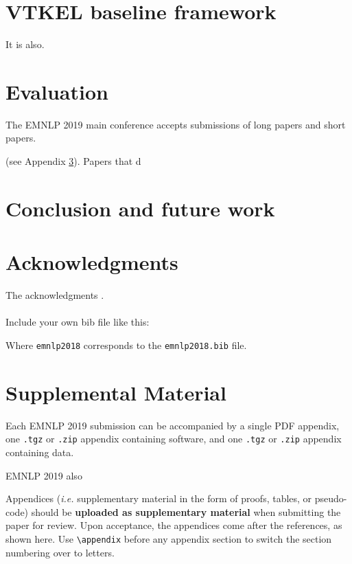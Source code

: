 \documentclass[11pt,a4paper]{article}
\newcommand\confname{EMNLP 2019}
\begin{document}

\section{VTKEL baseline framework}

It is also.

\section{Evaluation}
\label{sec:length}

The \confname{} main conference accepts submissions of long papers and
short papers.

 (see Appendix
\ref{sec:supplemental}). Papers that d


\section*{Conclusion and future work}

\section*{Acknowledgments}

The acknowledgments . \\

 \\

Include your own bib file like this:
{\small\verb||
\verb||}

Where \verb|emnlp2018| corresponds to the {\tt emnlp2018.bib} file.



\appendix

\section{Supplemental Material}
\label{sec:supplemental}
Each \confname{} submission can be accompanied by a single PDF
appendix, one {\small\tt.tgz} or {\small\tt.zip} appendix containing
software, and one {\small\tt.tgz} or {\small\tt.zip} appendix
containing data.

\confname{} also 


Appendices ({\em i.e.} supplementary material in the form of proofs, tables,
or pseudo-code) should be {\bf uploaded as supplementary material} when submitting the paper for review.
Upon acceptance, the appendices come after the references, as shown here. Use
\verb|\appendix| before any appendix section to switch the section
numbering over to letters.
\end{document}

